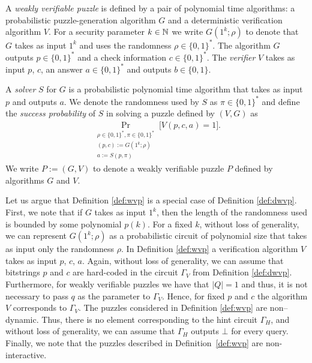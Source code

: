 \begin{definition}
  \label{def:wvp}
A \textit{weakly verifiable puzzle} is defined by a pair of polynomial time algorithms:
a probabilistic puzzle-generation algorithm $G$ and a deterministic verification algorithm $V$.
For a security parameter $k \in \mathbb{N}$ we write $G(1^k; \rho)$ to denote that $G$ takes as input $1^k$
and uses the randomness $\rho \in \{0,1\}^{*}$.
The algorithm $G$ outputs $p \in \{0,1\}^{*}$ and a check information $c \in \{0,1\}^{*}$.
The \textit{verifier} $V$ takes as input $p$, $c$, an answer $a \in \{0,1\}^{*}$ and outputs $b \in \{0,1\}$.

A \textit{solver} $S$ for $G$ is a probabilistic polynomial time algorithm that
takes as input $p$ and outputs $a$. We denote the randomness used by $S$ as $\pi \in \{0,1\}^{*}$
and define the \textit{success probability} of $S$ in solving a puzzle defined by $(V,G)$ as
\begin{align*}
  \underset{\substack{\rho \in \{0,1\}^{*}, \pi \in \{0,1\}^{*} \\ (p,c):=G(1^k; \rho) \\ a := S(p, \pi)}}{\Pr}\Big[ V(p,c,a) = 1\Big].
\end{align*}
We write $P := (G,V)$ to denote a weakly verifiable puzzle $P$ defined by algorithms $G$ and $V$.
\end{definition}

Let us argue that Definition \ref{def:wvp} is a special case of Definition \ref{def:dwvp}.
First, we note that if $G$ takes as input $1^k$, then the length of the randomness used is bounded by some polynomial $p(k)$.
For a fixed $k$, without loss of generality, we can represent $G(1^k; \rho)$ as a probabilistic circuit of polynomial size
that takes as input only the randomness $\rho$.
In Definition \ref{def:wvp} a verification algorithm $V$ takes as input $p$, $c$, $a$.
Again, without loss of generality, we can assume that bitstrings $p$ and $c$ are hard-coded
in the circuit $\Gamma_V$ from Definition \ref{def:dwvp}.
Furthermore, for weakly verifiable puzzles we have that $|Q| = 1$ and thus,
it is not necessary to pass $q$ as the parameter to $\Gamma_V$.
Hence, for fixed $p$ and $c$ the algorithm $V$ corresponds to $\Gamma_V$.
The puzzles considered in Definition \ref{def:wvp} are non--dynamic.
Thus, there is no element corresponding to the hint circuit $\Gamma_H$, and without loss of generality, we can assume that
$\Gamma_H$ outputs $\bot$ for every query.
Finally, we note that the puzzles described in Definition~\ref{def:wvp} are non-interactive.

